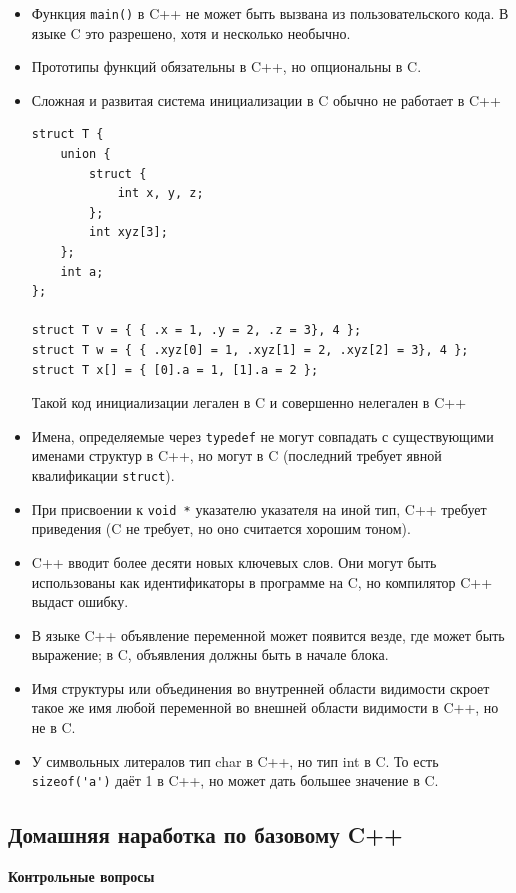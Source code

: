 \documentclass[a4paper,12pt,oneside]{article}
\begin{document}
\begin{itemize}
\item
Функция \lstinline!main()! в C++ не может быть вызвана из пользовательского кода. В языке C это разрешено, хотя и несколько необычно.
\item
Прототипы функций обязательны в C++, но опциональны в C.
\item
Сложная и развитая система инициализации в C обычно не работает в C++

\begin{lstlisting}
struct T {
    union {
        struct {
            int x, y, z;
        };
        int xyz[3];
    };
    int a;
};

struct T v = { { .x = 1, .y = 2, .z = 3}, 4 };
struct T w = { { .xyz[0] = 1, .xyz[1] = 2, .xyz[2] = 3}, 4 };
struct T x[] = { [0].a = 1, [1].a = 2 };
\end{lstlisting}

Такой код инициализации легален в C и совершенно нелегален в C++
\item
Имена, определяемые через \lstinline!typedef! не могут совпадать с существующими именами структур в C++, но могут в C (последний требует явной квалификации \lstinline!struct!).
\item
При присвоении к \lstinline!void *! указателю указателя на иной тип, C++ требует приведения (C не требует, но оно считается хорошим тоном).
\item
C++ вводит более десяти новых ключевых слов. Они могут быть использованы как идентификаторы в программе на C, но компилятор C++ выдаст ошибку.
\item
В языке C++ объявление переменной может появится везде, где может быть выражение; в C, объявления должны быть в начале блока.
\item
Имя структуры или объединения во внутренней области видимости скроет такое же имя любой переменной во внешней области видимости в C++, но не в C.
\item
У символьных литералов тип char в C++, но тип int в C. То есть \lstinline!sizeof('a')! даёт 1 в C++, но может дать большее значение в C.
\end{itemize}

\pagebreak
\subsection{Домашняя наработка по базовому C++}

\textbf{Контрольные вопросы} 
\end{document}
